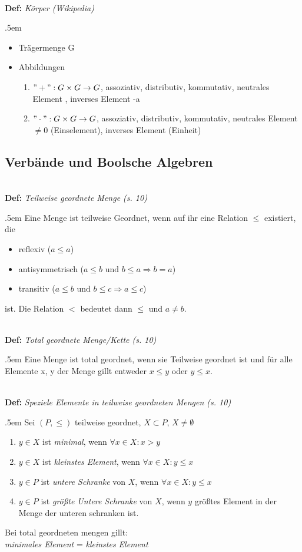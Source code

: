 \documentclass[twocolumn, 10pt]{article}
\newenvironment {definition}
                [1][]
                {\noindent\\{\bf
                Def:}\emph{
                #1}\indent\begin{addmargin}{.5em}}{\end{addmargin}}
\begin{document}
\begin{definition}[Körper (Wikipedia)]
\begin{itemize}
  \item Trägermenge G
  \item Abbildungen
  	\begin{enumerate}
    	\item $"+": G\times G \rightarrow G$, assoziativ, distributiv, kommutativ,
    	neutrales Element \grqq, inverses Element \glqq -a\grqq
    	\item $"\cdot ": G\times G \rightarrow G$, assoziativ, distributiv,
    	kommutativ, neutrales Element $\neq 0$ (\glqq Einselement\grqq ), inverses
    	Element (\glqq Einheit\grqq )
  	\end{enumerate}
\end{itemize}
\end{definition}



\subsection*{Verbände und Boolsche Algebren}

\begin{definition}[Teilweise geordnete Menge (s. 10)]
Eine Menge ist teilweise Geordnet, wenn auf ihr eine Relation $\leq$ existiert,
die \begin{itemize}
  \item reflexiv ($a\leq a$)
  \item antisymmetrisch ($a \leq b \text{ und } b\leq a \Rightarrow b = a$)
  \item transitiv ($a\leq b \text{ und } b\leq c \Rightarrow a\leq c$)
\end{itemize}
ist. Die Relation $<$ bedeutet dann $\leq$ und $a\neq b$.
\end{definition}

\begin{definition}[Total geordnete Menge/Kette (s. 10)]
Eine Menge ist total geordnet, wenn sie Teilweise geordnet ist und für alle
Elemente x, y der Menge gillt entweder $x \leq y$ oder $y \leq x$.
\end{definition}

\begin{definition}[Speziele Elemente in teilweise geordneten Mengen (s. 10)]
Sei $(P, \leq)$ teilweise geordnet, $X \subset P$, $X \neq \emptyset$
\begin{enumerate}
  \item $y \in X$ ist \emph{minimal}, wenn $\forall x \in X: x > y$
  \item $y \in X$ ist \emph{kleinstes Element}, wenn $\forall x \in X: y \leq x$ 
  \item $y \in P$ ist \emph{untere Schranke} von $X$, wenn $\forall x \in X: y
  \leq x$
  \item $y \in P$ ist \emph{größte Untere Schranke} von $X$, wenn $y$ größtes
  Element in der Menge der unteren schranken ist.
\end{enumerate}
Bei total geordneten mengen gillt:\\\indent \emph{minimales Element} =
\emph{kleinstes Element}
\end{definition}
\end{document}
